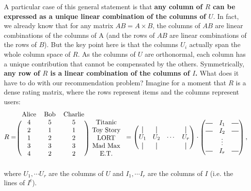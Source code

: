 A particular case of this general statement is that \textbf{any column of $R$
can be expressed as a unique linear combination of the columns of $U$}. In
fact, we already know that for any matrix  $AB = A \times B$, the columns of $AB$ are
linear combinations of the columns of A (and the rows of $AB$ are linear
combinations of the rows of $B$). But the key point here is that the columns $U_i$
actually span the whole column space of $R$. As the
columns of $U$ are orthonormal, each column has a unique contribution that
cannot be compensated by the others. Symmetrically, \textbf{any row of $R$ is a
linear combination of the columns of $I$.} What does it have to do with our
recommendation problem? Imagine for a moment that $R$ is a dense rating matrix,
where the rows represent items and the columns represent users:
$$
R = \begin{blockarray}{cccc}
  \text{Alice} & \text{Bob} & \text{Charlie} \\
\begin{block}{(ccc) c}
  4 & 5 & 5 & \text{Titanic} \\
  2 & 1 & 1 & \text{Toy Story} \\
  1 & 2 & 2 & \text{LORT} \\
  3 & 3 & 3 & \text{Mad Max} \\
  4 & 2 & 2 & \text{E.T.} \\
\end{block}
\end{blockarray}
=
\begin{pmatrix}
  \vertbar & \vertbar & & \vertbar\\
  U_1& U_2 & \cdots & U_r\\
  \vertbar & \vertbar & & \vertbar\\
\end{pmatrix}
\cdot
\begin{pmatrix}
  \horzbar& I_1 & \horzbar\\
  \horzbar& I_2 & \horzbar\\
   & \vdots & \\
  \horzbar& I_r &\horzbar \\
\end{pmatrix}
,
$$
where $U_1, \cdots U_r$ are the columns of $U$ and $I_1, \cdots I_r$ are the
columns of $I$ (i.e. the lines of $I^t$).

